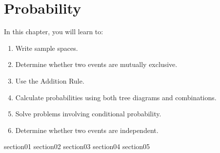 \chapter{Probability}\label{chapter_probability}

In this chapter, you will learn to:
\begin{enumerate}
    \item Write sample spaces.
    \item Determine whether two events are mutually exclusive.
    \item Use the Addition Rule.
    \item Calculate probabilities using both tree diagrams and combinations.
    \item Solve problems involving conditional probability.
    \item Determine whether two events are independent.
\end{enumerate}

{section01}
{section02}
{section03}
{section04}
{section05}